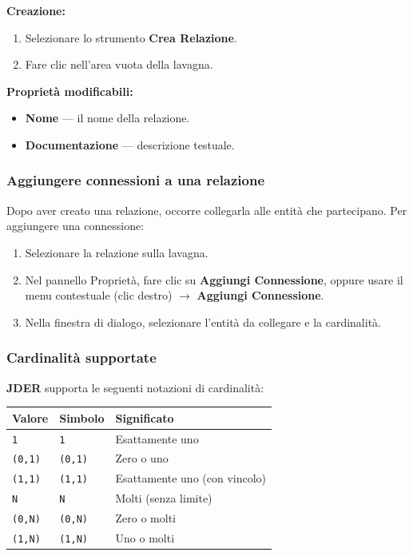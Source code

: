 \documentclass[a4paper,11pt]{article}
\newcommand{\uielement}[1]{\textbf{#1}}
\newcommand{\jder}{\textbf{JDER}}
\begin{document}
\textbf{Creazione:}
\begin{enumerate}
  \item Selezionare lo strumento \uielement{Crea Relazione}.
  \item Fare clic nell'area vuota della lavagna.
\end{enumerate}

\textbf{Proprietà modificabili:}
\begin{itemize}
  \item \textbf{Nome} --- il nome della relazione.
  \item \textbf{Documentazione} --- descrizione testuale.
\end{itemize}

\subsubsection{Aggiungere connessioni a una relazione}

Dopo aver creato una relazione, occorre collegarla alle entità che partecipano. Per aggiungere
una connessione:

\begin{enumerate}
  \item Selezionare la relazione sulla lavagna.
  \item Nel pannello Proprietà, fare clic su \uielement{Aggiungi Connessione}, oppure usare il
        menu contestuale (clic destro) $\to$ \uielement{Aggiungi Connessione}.
  \item Nella finestra di dialogo, selezionare l'entità da collegare e la cardinalità.
\end{enumerate}

\subsubsection{Cardinalità supportate}

\jder{} supporta le seguenti notazioni di cardinalità:

\begin{center}
\begin{tabular}{@{}lll@{}}
  \toprule
  \textbf{Valore} & \textbf{Simbolo} & \textbf{Significato} \\
  \midrule
  \texttt{1}      & \texttt{1}       & Esattamente uno \\
  \texttt{(0,1)}  & \texttt{(0,1)}   & Zero o uno \\
  \texttt{(1,1)}  & \texttt{(1,1)}   & Esattamente uno (con vincolo) \\
  \texttt{N}      & \texttt{N}       & Molti (senza limite) \\
  \texttt{(0,N)}  & \texttt{(0,N)}   & Zero o molti \\
  \texttt{(1,N)}  & \texttt{(1,N)}   & Uno o molti \\
  \bottomrule
\end{tabular}
\end{center}
\end{document}

